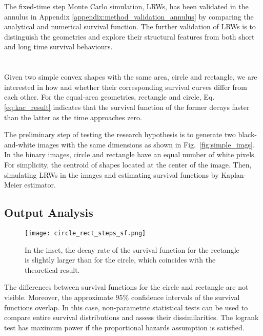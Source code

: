 
The fixed-time step Monte Carlo simulation, LRWs, has been validated
in the annulus in Appendix \ref{appendix:method_validation_annulus} by
comparing the analytical and numerical survival function. The further
validation of LRWs is to distinguish the geometries and explore their
structural features from both short and long time survival behaviours.



\section{}

Given two simple convex shapes with the same area, circle and
rectangle, we are interested in how and whether their corresponding
survival curves differ from each other. For the equal-area geometries,
rectangle and circle, Eq. \ref{eq:kac_result} indicates that the
survival function of the former decays faster than the latter as the
time approaches zero.

The preliminary step of testing the research hypothesis is to generate
two black-and-white images with the same dimensions as shown in
Fig.~\ref{fig:simple_imgs}. In the binary images, circle and rectangle
have an equal number of white pixels. For simplicity, the centroid of
shapes located at the center of the image. Then, simulating LRWs in
the images and estimating survival functions by Kaplan-Meier
estimator.


 \subsection{Output Analysis}
 
   \begin{figure}
     \centering
     \texttt{[image: circle\_rect\_steps\_sf.png]}
     \label{fig:sf_simple_shape_steps}
     \caption{In the inset, the decay rate of the survival function for the rectangle is slightly larger than for the circle, which coincides with the theoretical result.}
   \end{figure}

  The differences between survival functions for the circle and
  rectangle are not visible. Moreover, the approximate $95\%$
  confidence intervals of the survival functions overlap. In this
  case, non-parametric statistical tests can be used to compare entire
  survival distributions and assess their dissimilarities. The logrank
  test has maximum power if the proportional hazards assumption is
  satisfied. 


